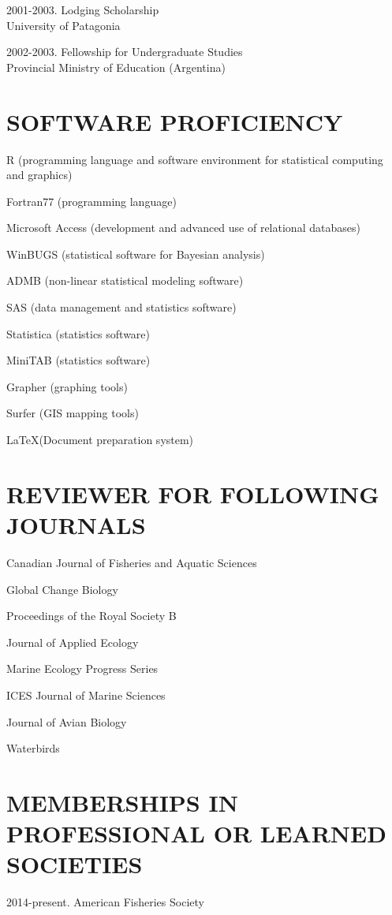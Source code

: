 \documentclass{res}
\begin{document}
\begin{resume}
\begin{hangparas}{.4in}{1}
2001-2003. Lodging Scholarship\\
University of Patagonia

2002-2003. Fellowship for Undergraduate Studies\\
Provincial Ministry of Education (Argentina)
\end{hangparas}
\section{SOFTWARE PROFICIENCY}
\vspace{0.2in} 

R (programming language and software environment for statistical computing and graphics)

Fortran77 (programming language)

Microsoft Access (development and advanced use of relational databases)

WinBUGS (statistical software for Bayesian analysis)

ADMB (non-linear statistical modeling software)

SAS (data management and statistics software)

Statistica (statistics software)

MiniTAB (statistics software)

Grapher (graphing tools)

Surfer (GIS mapping tools)

\LaTeX (Document preparation system)

\section{REVIEWER FOR FOLLOWING JOURNALS}
\vspace{0.2in}
Canadian Journal of Fisheries and Aquatic Sciences

Global Change Biology

Proceedings of the Royal Society B

Journal of Applied Ecology

Marine Ecology Progress Series

ICES Journal of Marine Sciences

Journal of Avian Biology

Waterbirds

\section{MEMBERSHIPS IN PROFESSIONAL OR LEARNED SOCIETIES}
\vspace{0.2in}
\begin{hangparas}{.4in}{1}
2014-present. American Fisheries Society


\end{hangparas}
\end{resume}
\end{document}
